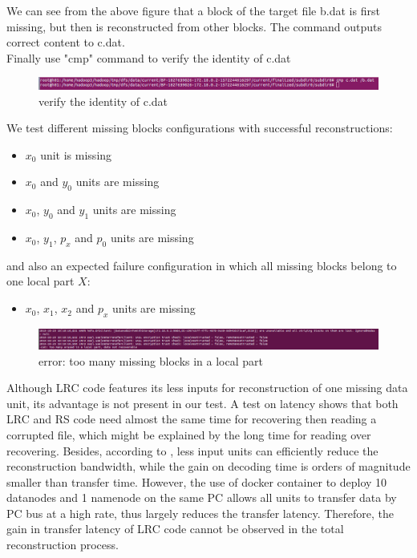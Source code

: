 \documentclass[10pt]{article}
\begin{document}
We can see from the above figure that a block of the target file b.dat is first missing, but then is  
reconstructed from other blocks. The command outputs correct content to c.dat. \\

Finally use "cmp" command to verify the identity of c.dat
\begin{figure}[H]
  \centering
  \includegraphics[width=\linewidth]{test-8.png}
  \caption{verify the identity of c.dat}
\end{figure}

We test different missing blocks configurations with successful reconstructions:
\begin{itemize}
\item $x_0$ unit is missing
\item $x_0$ and $y_0$ units are missing
\item $x_0$, $y_0$ and $y_1$ units are missing
\item $x_0$, $y_1$, $p_x$ and $p_0$ units are missing
\end{itemize}
and also an expected failure configuration in which all missing blocks belong to
one local part $X$:
\begin{itemize}
  \item $x_0$, $x_1$, $x_2$ and $p_x$ units are missing
\end{itemize}
\begin{figure}[H]
  \centering
  \includegraphics[width=\linewidth]{test-9.png}
  \caption{error: too many missing blocks in a local part}
\end{figure}

Although LRC code features its less inputs for reconstruction of one missing data 
unit, its advantage is not present in our test. A test on latency shows that both LRC and
RS code need almost the same time for recovering then reading a corrupted file, which 
might be explained by the long time for reading over recovering. Besides, 
according to \cite{lrcPaper}, less
input units can efficiently reduce the reconstruction bandwidth, while the gain
on decoding time is orders of magnitude smaller than transfer time. However, the use
of docker container to deploy 10 datanodes and 1 namenode on the same PC allows all 
units to transfer data by PC bus at a high rate, thus largely reduces the transfer 
latency. Therefore, the gain in transfer latency of LRC code cannot be observed
in the total reconstruction process. 
\end{document}
